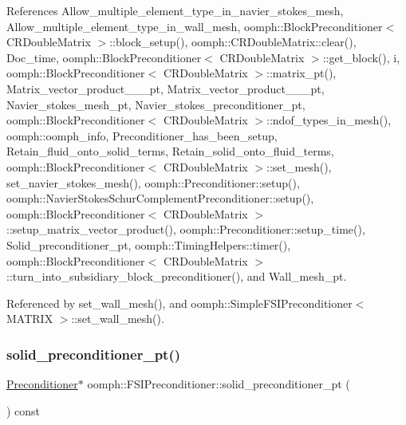 References Allow\+\_\+multiple\+\_\+element\+\_\+type\+\_\+in\+\_\+navier\+\_\+stokes\+\_\+mesh, Allow\+\_\+multiple\+\_\+element\+\_\+type\+\_\+in\+\_\+wall\+\_\+mesh, oomph\+::\+Block\+Preconditioner$<$ C\+R\+Double\+Matrix $>$\+::block\+\_\+setup(), oomph\+::\+C\+R\+Double\+Matrix\+::clear(), Doc\+\_\+time, oomph\+::\+Block\+Preconditioner$<$ C\+R\+Double\+Matrix $>$\+::get\+\_\+block(), i, oomph\+::\+Block\+Preconditioner$<$ C\+R\+Double\+Matrix $>$\+::matrix\+\_\+pt(), Matrix\+\_\+vector\+\_\+product\+\_\+\_\+\_\+pt, Matrix\+\_\+vector\+\_\+product\+\_\+\_\+\_\+pt, Navier\+\_\+stokes\+\_\+mesh\+\_\+pt, Navier\+\_\+stokes\+\_\+preconditioner\+\_\+pt, oomph\+::\+Block\+Preconditioner$<$ C\+R\+Double\+Matrix $>$\+::ndof\+\_\+types\+\_\+in\+\_\+mesh(), oomph\+::oomph\+\_\+info, Preconditioner\+\_\+has\+\_\+been\+\_\+setup, Retain\+\_\+fluid\+\_\+onto\+\_\+solid\+\_\+terms, Retain\+\_\+solid\+\_\+onto\+\_\+fluid\+\_\+terms, oomph\+::\+Block\+Preconditioner$<$ C\+R\+Double\+Matrix $>$\+::set\+\_\+mesh(), set\+\_\+navier\+\_\+stokes\+\_\+mesh(), oomph\+::\+Preconditioner\+::setup(), oomph\+::\+Navier\+Stokes\+Schur\+Complement\+Preconditioner\+::setup(), oomph\+::\+Block\+Preconditioner$<$ C\+R\+Double\+Matrix $>$\+::setup\+\_\+matrix\+\_\+vector\+\_\+product(), oomph\+::\+Preconditioner\+::setup\+\_\+time(), Solid\+\_\+preconditioner\+\_\+pt, oomph\+::\+Timing\+Helpers\+::timer(), oomph\+::\+Block\+Preconditioner$<$ C\+R\+Double\+Matrix $>$\+::turn\+\_\+into\+\_\+subsidiary\+\_\+block\+\_\+preconditioner(), and Wall\+\_\+mesh\+\_\+pt.



Referenced by set\+\_\+wall\+\_\+mesh(), and oomph\+::\+Simple\+F\+S\+I\+Preconditioner$<$ M\+A\+T\+R\+I\+X $>$\+::set\+\_\+wall\+\_\+mesh().

\mbox{\label{classoomph_1_1FSIPreconditioner_abc97d84c4d0e7a280947855b7f33c34c}} 
\subsubsection{\texorpdfstring{solid\+\_\+preconditioner\+\_\+pt()}{solid\_preconditioner\_pt()}}
{\footnotesize\ttfamily \hyperlink{classoomph_1_1Preconditioner}{Preconditioner}$\ast$ oomph\+::\+F\+S\+I\+Preconditioner\+::solid\+\_\+preconditioner\+\_\+pt (\begin{DoxyParamCaption}{ }\end{DoxyParamCaption}) const\hspace{0.3cm}{\ttfamily [inline]}}



